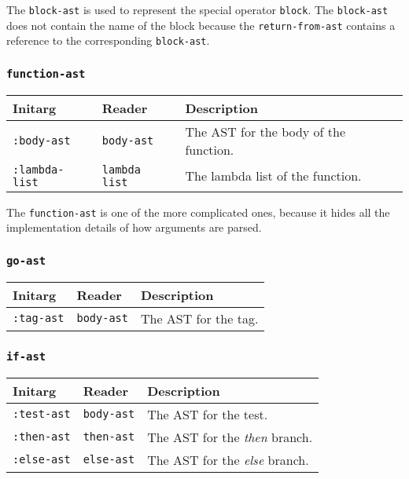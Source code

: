 The \texttt{block-ast} is used to represent the \commonlisp{} special operator
\texttt{block}.  The \texttt{block-ast} does not contain the name of
the block because the \texttt{return-from-ast} contains a reference to
the corresponding \texttt{block-ast}.

\subsubsection{\texttt{function-ast}}
\label{function-ast}

\begin{tabular}{|l|l|l|}
\hline
Initarg & Reader & Description\\
\hline\hline
\texttt{:body-ast} & \texttt{body-ast} & The AST for the body of the function.\\
\hline
\texttt{:lambda-list} & \texttt{lambda list} & The lambda list of the function.\\
\hline
\end{tabular}

The \texttt{function-ast} is one of the more complicated ones, because
it hides all the implementation details of how arguments are parsed. 

\subsubsection{\texttt{go-ast}}
\label{go-ast}

\begin{tabular}{|l|l|l|}
\hline
Initarg & Reader & Description\\
\hline\hline
\texttt{:tag-ast} & \texttt{body-ast} & The AST for the tag.\\
\hline
\end{tabular}

\subsubsection{\texttt{if-ast}}
\label{if-ast}

\begin{tabular}{|l|l|l|}
\hline
Initarg & Reader & Description\\
\hline\hline
\texttt{:test-ast} & \texttt{body-ast} & The AST for the test.\\
\hline
\texttt{:then-ast} & \texttt{then-ast} & The AST for the \emph{then} branch.\\
\hline
\texttt{:else-ast} & \texttt{else-ast} & The AST for the \emph{else} branch.\\
\hline
\end{tabular}

